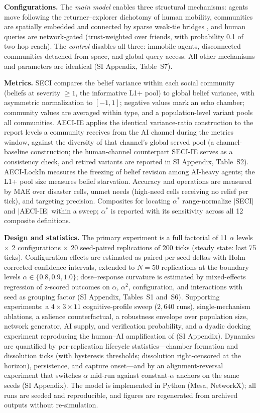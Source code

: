 \documentclass[pdflatex,sn-nature]{sn-jnl}
\begin{document}
\textbf{Configurations.} The \emph{main model} enables three structural mechanisms: agents move following the returner--explorer dichotomy of human mobility, communities are spatially embedded and connected by sparse weak-tie bridges \citep{granovetter1973strength}, and human queries are network-gated (trust-weighted over friends, with probability 0.1 of two-hop reach). The \emph{control} disables all three: immobile agents, disconnected communities detached from space, and global query access. All other mechanisms and parameters are identical (SI Appendix, Table~S7).

\textbf{Metrics.} SECI compares the belief variance within each social community (beliefs at severity $\geq 1$, the informative L1+ pool) to global belief variance, with asymmetric normalization to $[-1, 1]$; negative values mark an echo chamber; community values are averaged within type, and a population-level variant pools all communities. AECI-IE applies the identical variance-ratio construction to the report levels a community receives from the AI channel during the metrics window, against the diversity of that channel's global served pool (a channel-baseline construction; the human-channel counterpart SECI-IE serves as a consistency check, and retired variants are reported in SI Appendix, Table~S2). AECI-LockIn measures the freezing of belief revision among AI-heavy agents; the L1+ pool size measures belief starvation. Accuracy and operations are measured by MAE over disaster cells, unmet needs (high-need cells receiving no relief per tick), and targeting precision. Composites for locating $\alpha^{*}$ range-normalize $|$SECI$|$ and $|$AECI-IE$|$ within a sweep; $\alpha^{*}$ is reported with its sensitivity across all 12 composite definitions.

\textbf{Design and statistics.} The primary experiment is a full factorial of 11 $\alpha$ levels $\times$ 2 configurations $\times$ 20 seed-paired replications of 200 ticks (steady state: last 75 ticks). Configuration effects are estimated as paired per-seed deltas with Holm-corrected confidence intervals, extended to $N=50$ replications at the boundary levels $\alpha \in \{0.8, 0.9, 1.0\}$; dose--response curvature is estimated by mixed-effects regression of z-scored outcomes on $\alpha$, $\alpha^2$, configuration, and interactions with seed as grouping factor (SI Appendix, Tables~S1 and~S6). Supporting experiments: a $4 \times 3 \times 11$ cognitive-profile sweep ($2{,}640$ runs), single-mechanism ablations, a salience counterfactual, a robustness envelope over population size, network generator, AI supply, and verification probability, and a dyadic docking experiment reproducing the human--AI amplification of \citet{glickman2024human} (SI Appendix). Dynamics are quantified by per-replication lifecycle statistics---chamber formation and dissolution ticks (with hysteresis thresholds; dissolution right-censored at the horizon), persistence, and capture onset---and by an alignment-reversal experiment that switches $\alpha$ mid-run against constant-$\alpha$ anchors on the same seeds (SI Appendix). The model is implemented in Python (Mesa, NetworkX); all runs are seeded and reproducible, and figures are regenerated from archived outputs without re-simulation.
\end{document}
